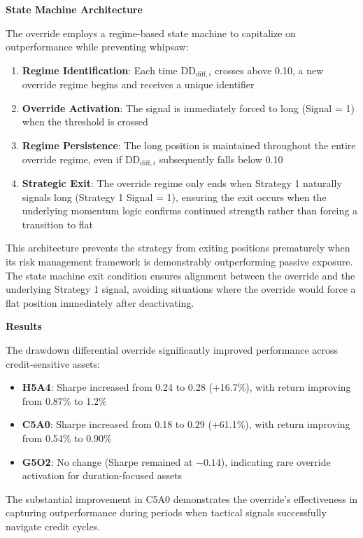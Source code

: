 \documentclass[11pt, letterpaper]{article}
\begin{document}
\textbf{State Machine Architecture}

The override employs a regime-based state machine to capitalize on outperformance while preventing whipsaw:

\begin{enumerate}
    \item \textbf{Regime Identification}: Each time DD$_{\text{diff},i}$ crosses above 0.10, a new override regime begins and receives a unique identifier
    \item \textbf{Override Activation}: The signal is immediately forced to long (Signal = 1) when the threshold is crossed
    \item \textbf{Regime Persistence}: The long position is maintained throughout the entire override regime, even if DD$_{\text{diff},i}$ subsequently falls below 0.10
    \item \textbf{Strategic Exit}: The override regime only ends when Strategy 1 naturally signals long (Strategy 1 Signal = 1), ensuring the exit occurs when the underlying momentum logic confirms continued strength rather than forcing a transition to flat
\end{enumerate}

This architecture prevents the strategy from exiting positions prematurely when its risk management framework is demonstrably outperforming passive exposure. The state machine exit condition ensures alignment between the override and the underlying Strategy 1 signal, avoiding situations where the override would force a flat position immediately after deactivating.

\textbf{Results}

The drawdown differential override significantly improved performance across credit-sensitive assets:

\begin{itemize}
    \item \textbf{H5A4}: Sharpe increased from 0.24 to 0.28 (+16.7\%), with return improving from 0.87\% to 1.2\%
    \item \textbf{C5A0}: Sharpe increased from 0.18 to 0.29 (+61.1\%), with return improving from 0.54\% to 0.90\%
    \item \textbf{G5O2}: No change (Sharpe remained at $-0.14$), indicating rare override activation for duration-focused assets
\end{itemize}

The substantial improvement in C5A0 demonstrates the override's effectiveness in capturing outperformance during periods when tactical signals successfully navigate credit cycles.
\end{document}
